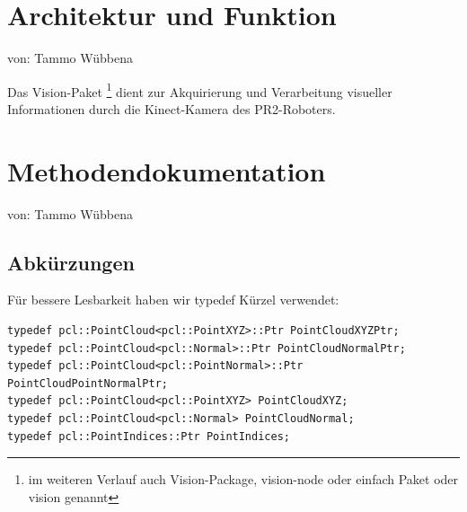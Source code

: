 \documentclass{suturo}
\begin{document}

\makeatletter
\newcommand{\chapterauthor}[1]{%
  {\parindent0pt\vspace*{-47pt}%
  \linespread{2.2}\large\begin{flushright}von: #1\end{flushright}%
  \par\nobreak\vspace*{0pt}}
  \@afterheading%
}
\makeatother

\section*{Architektur und Funktion}
\chapterauthor{Tammo Wübbena}
Das Vision-Paket \footnote{im weiteren Verlauf auch Vision-Package, vision-node oder einfach Paket oder vision genannt} dient zur Akquirierung und Verarbeitung visueller Informationen durch die Kinect-Kamera des PR2-Roboters.

\begin{figure}[!htb]
\end{figure}
      
\section*{Methodendokumentation}
\chapterauthor{Tammo Wübbena}

\subsection{Abkürzungen}
Für bessere Lesbarkeit haben wir typedef Kürzel verwendet:
\begin{verbatim}
typedef pcl::PointCloud<pcl::PointXYZ>::Ptr PointCloudXYZPtr;
typedef pcl::PointCloud<pcl::Normal>::Ptr PointCloudNormalPtr;
typedef pcl::PointCloud<pcl::PointNormal>::Ptr PointCloudPointNormalPtr;
typedef pcl::PointCloud<pcl::PointXYZ> PointCloudXYZ;
typedef pcl::PointCloud<pcl::Normal> PointCloudNormal;
typedef pcl::PointIndices::Ptr PointIndices;
\end{verbatim}
\end{document}
